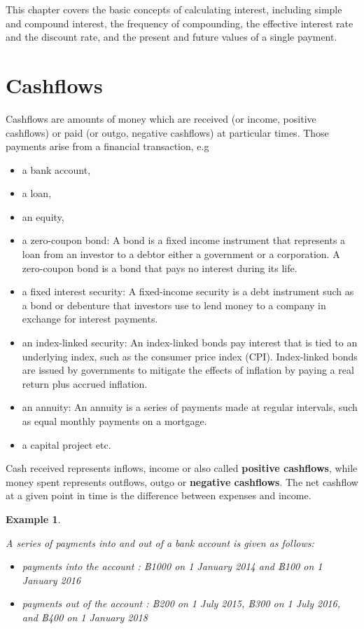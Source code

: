 \documentclass[
]{book}
\theoremstyle{definition}
\theoremstyle{definition}
\newtheorem{example}{Example}[chapter]
\theoremstyle{definition}
\theoremstyle{definition}
\theoremstyle{remark}
\begin{document}
This chapter covers the basic concepts of calculating interest,
including simple and compound interest, the frequency of compounding,
the effective interest rate and the discount rate, and the present and
future values of a single payment.

\hypertarget{cashflows}{%
\section{Cashflows}\label{cashflows}}

Cashflows are amounts of money which are received (or income, positive
cashflows) or paid (or outgo, negative cashflows) at particular times.
Those payments arise from a financial transaction, e.g

\begin{itemize}
\item
  a bank account,
\item
  a loan,
\item
  an equity,
\item
  a zero-coupon bond: A bond is a fixed income instrument that
  represents a loan from an investor to a debtor either a government
  or a corporation. A zero-coupon bond is a bond that pays no interest
  during its life.
\item
  a fixed interest security: A fixed-income security is a debt
  instrument such as a bond or debenture that investors use to lend
  money to a company in exchange for interest payments.
\item
  an index-linked security: An index-linked bonds pay interest that is
  tied to an underlying index, such as the consumer price index (CPI).
  Index-linked bonds are issued by governments to mitigate the effects
  of inflation by paying a real return plus accrued inflation.
\item
  an annuity: An annuity is a series of payments made at regular
  intervals, such as equal monthly payments on a mortgage.
\item
  a capital project etc.
\end{itemize}

Cash received represents inflows, income or also called \textbf{positive
cashflows}, while money spent represents outflows, outgo or \textbf{negative
cashflows}. The net cashflow at a given point in time is the difference
between expenses and income.

\begin{example}
\protect\hypertarget{exm:unlabeled-div-1}{}\label{exm:unlabeled-div-1}

\emph{A series of payments into and out of a bank account is given as
follows:}

\begin{itemize}
\item
  \emph{payments into the account : ฿1000 on 1 January 2014 and ฿100 on 1
  January 2016}
\item
  \emph{payments out of the account : ฿200 on 1 July 2015, ฿300 on 1 July
  2016, and ฿400 on 1 January 2018}
\end{itemize}

\end{example}
\end{document}
